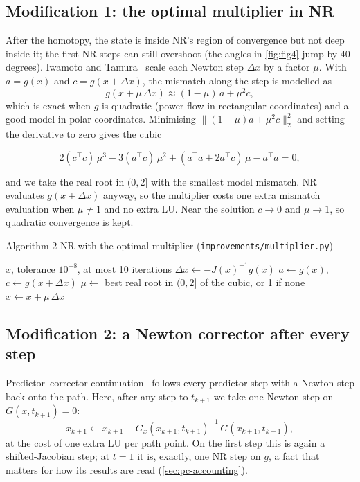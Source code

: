 \documentclass[11pt,a4paper]{article}
\newcommand{\norm}[1]{\lVert #1\rVert}
\newcommand{\ninf}[1]{\lVert #1\rVert_\infty}
\begin{document}
\subsection{Modification 1: the optimal multiplier in NR}
After the homotopy, the state is inside NR's region of convergence but not deep inside it; the first NR
steps can still overshoot (the angles in \cref{fig:fig4} jump by 40 degrees). Iwamoto and
Tamura~\cite{iwamoto1981} scale each Newton step $\Delta x$ by a factor $\mu$. With $a=g(x)$ and
$c=g(x+\Delta x)$, the mismatch along the step is modelled as
\begin{equation}
  g(x+\mu\,\Delta x) \approx (1-\mu)\,a + \mu^2 c,
\end{equation}
which is exact when $g$ is quadratic (power flow in rectangular coordinates) and a good model in polar
coordinates. Minimising $\norm{(1-\mu)a+\mu^2c}_2^2$ and setting the derivative to zero gives the cubic
\begin{keyeq}
\begin{equation}
  2(c^{\top}c)\,\mu^3 - 3(a^{\top}c)\,\mu^2 + (a^{\top}a + 2a^{\top}c)\,\mu - a^{\top}a = 0,
\end{equation}
\end{keyeq}
and we take the real root in $(0,2]$ with the smallest model mismatch. NR evaluates $g(x+\Delta x)$
anyway, so the multiplier costs one extra mismatch evaluation when $\mu\neq1$ and no extra LU. Near the
solution $c\to0$ and $\mu\to1$, so quadratic convergence is kept.

\begin{algo}{Algorithm 2 \quad NR with the optimal multiplier (\texttt{improvements/multiplier.py})}
\begin{algorithmic}[1]
\Require $x$, tolerance $10^{-8}$, at most 10 iterations
\While{$\ninf{g(x)}\ge 10^{-8}$ \textbf{and} fewer than 10 iterations}
  \State $\Delta x \gets -J(x)^{-1}g(x)$ 
  \State $a\gets g(x)$,\ \ $c\gets g(x+\Delta x)$
  \State $\mu \gets$ best real root in $(0,2]$ of the cubic, or 1 if none
  \State $x\gets x+\mu\,\Delta x$
\EndWhile
\end{algorithmic}
\end{algo}

\subsection{Modification 2: a Newton corrector after every step}
Predictor--corrector continuation~\cite{allgower2003} follows every predictor step with a Newton step back
onto the path. Here, after any step to $t_{k+1}$ we take one Newton step on $G(x,t_{k+1})=0$:
\begin{equation}
  x_{k+1} \gets x_{k+1} - G_x(x_{k+1},t_{k+1})^{-1}\,G(x_{k+1},t_{k+1}),
\end{equation}
at the cost of one extra LU per path point. On the first step this is again a shifted-Jacobian step; at
$t=1$ it is, exactly, one NR step on $g$, a fact that matters for how its results are read
(\cref{sec:pc-accounting}).
\end{document}
